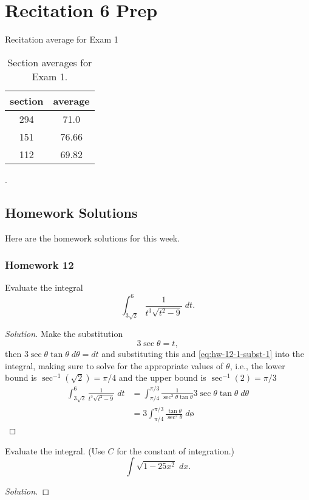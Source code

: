 \chapter{Recitation 6 Prep}
Recitation average for Exam 1
\begin{table}[htbp]
\caption{Section averages for Exam 1.}
\label{tab:sec-avg}
\centering
\begin{tabular}{|c|c|}
\hline
section&average\\
\hline
294&71.0\\
151&76.66\\
112&69.82\\
\hline
\end{tabular}.
\end{table}
\section{Homework Solutions}
Here are the homework solutions for this week.
\subsection{Homework 12}
\begin{problem}[WebAssign, HW 12, \# 1]
Evaluate the integral
\[
\int_{3\sqrt{2}}^6\frac{1}{t^3\sqrt{t^2-9}}\;dt.
\]
\end{problem}
\begin{proof}[Solution]
Make the substitution
\begin{equation}
\label{eq:hw-12-1-subst-1}
3\sec\theta=t,
\end{equation}
then $3\sec\theta\tan\theta\;d\theta=dt$ and substituting this and
\eqref{eq:hw-12-1-subst-1} into the integral, making sure to solve for the
appropriate values of $\theta$, i.e., the lower bound is
$\sec^{-1}\left(\sqrt{2}\right)=\pi/4$ and the upper bound is
$\sec^{-1}(2)=\pi/3$
\begin{align*}
\int_{3\sqrt{2}}^6\frac{1}{t^3\sqrt{t^2-9}}\;dt
&=\int_{\pi/4}^{\pi/3}\frac{1}{\sec^3\theta\tan\theta}3\sec\theta\tan\theta\;d\theta\\
&=3\int_{\pi/4}^{\pi/3}\frac{\tan\theta}{\sec^2\theta}\;dø
\end{align*}
\end{proof}

\begin{problem}[WebAssign, HW 12, \# 2]
Evaluate the integral. (Use $C$ for the constant of integration.)
\[
\int\sqrt{1-25x^2}\;dx.
\]
\end{problem}
\begin{proof}[Solution]
\end{proof}

